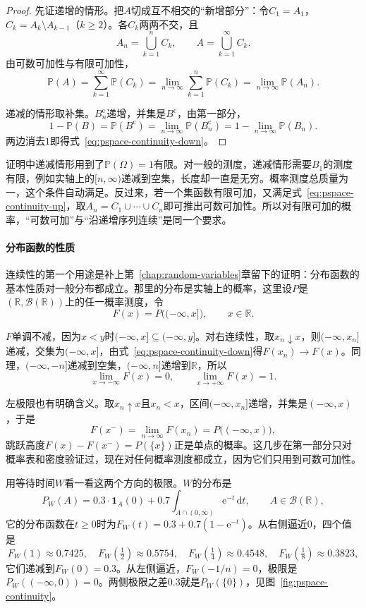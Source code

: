 \begin{proof}
先证递增的情形。把$A$切成互不相交的“新增部分”：令$C_1=A_1$，$C_k=A_k\setminus A_{k-1}$（$k\geq2$）。各$C_k$两两不交，且
\[
  A_n=\bigcup_{k=1}^{n}C_k,\qquad A=\bigcup_{k=1}^{\infty}C_k .
\]
由可数可加性与有限可加性，
\[
  \mathbb{P}(A)=\sum_{k=1}^{\infty}\mathbb{P}(C_k)=\lim_{n\to\infty}\sum_{k=1}^{n}\mathbb{P}(C_k)=\lim_{n\to\infty}\mathbb{P}(A_n).
\]

递减的情形取补集。$B_n^{\mathrm{c}}$递增，并集是$B^{\mathrm{c}}$，由第一部分，
\[
  1-\mathbb{P}(B)=\mathbb{P}(B^{\mathrm{c}})=\lim_{n\to\infty}\mathbb{P}(B_n^{\mathrm{c}})=1-\lim_{n\to\infty}\mathbb{P}(B_n).
\]
两边消去$1$即得式~\eqref{eq:pspace-continuity-down}。
\end{proof}

证明中递减情形用到了$\mathbb{P}(\Omega)=1$有限。对一般的测度，递减情形需要$B_1$的测度有限，例如实轴上的$[n,\infty)$递减到空集，长度却一直是无穷。概率测度总质量为一，这个条件自动满足。反过来，若一个集函数有限可加，又满足式~\eqref{eq:pspace-continuity-up}，取$A_n=C_1\cup\cdots\cup C_n$即可推出可数可加性。所以对有限可加的概率，“可数可加”与“沿递增序列连续”是同一个要求。

\paragraph{分布函数的性质}
连续性的第一个用途是补上第~\ref{chap:random-variables}章留下的证明：分布函数的基本性质对一般分布都成立。那里的分布是实轴上的概率，这里设$P$是$(\mathbb{R},\mathcal{B}(\mathbb{R}))$上的任一概率测度，令
\begin{equation}
  F(x)=P\bigl((-\infty,x]\bigr),\qquad x\in\mathbb{R}.
  \label{eq:pspace-cdf}
\end{equation}

$F$单调不减，因为$x<y$时$(-\infty,x]\subseteq(-\infty,y]$。对右连续性，取$x_n\downarrow x$，则$(-\infty,x_n]$递减，交集为$(-\infty,x]$，由式~\eqref{eq:pspace-continuity-down}得$F(x_n)\to F(x)$。同理，$(-\infty,-n]$递减到空集，$(-\infty,n]$递增到$\mathbb{R}$，所以
\[
  \lim_{x\to-\infty}F(x)=0,\qquad \lim_{x\to+\infty}F(x)=1 .
\]

左极限也有明确含义。取$x_n\uparrow x$且$x_n<x$，区间$(-\infty,x_n]$递增，并集是$(-\infty,x)$，于是
\[
  F(x^{-})=\lim_{n\to\infty}F(x_n)=P\bigl((-\infty,x)\bigr),
\]
跳跃高度$F(x)-F(x^{-})=P(\{x\})$正是单点的概率。这几步在第一部分只对概率表和密度验证过，现在对任何概率测度都成立，因为它们只用到可数可加性。

用等待时间$W$看一看这两个方向的极限。$W$的分布是
\begin{equation}
  P_W(A)=0.3\cdot\mathbf{1}_{A}(0)+0.7\int_{A\cap(0,\infty)}\mathrm{e}^{-t}\,\mathrm{d}t,\qquad A\in\mathcal{B}(\mathbb{R}),
  \label{eq:pspace-waiting-law}
\end{equation}
它的分布函数在$t\geq0$时为$F_W(t)=0.3+0.7(1-\mathrm{e}^{-t})$。从右侧逼近$0$，四个值是
\[
  F_W(1)\approx0.7425,\quad F_W(\tfrac12)\approx0.5754,\quad F_W(\tfrac14)\approx0.4548,\quad F_W(\tfrac18)\approx0.3823,
\]
它们递减到$F_W(0)=0.3$。从左侧逼近，$F_W(-1/n)=0$，极限是$P_W((-\infty,0))=0$。两侧极限之差$0.3$就是$P_W(\{0\})$，见图~\ref{fig:pspace-continuity}。

